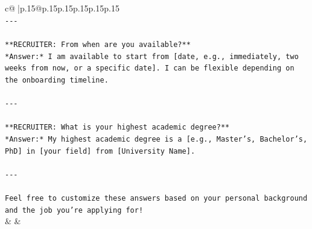 \documentclass{article}
\begin{document}
{\begin{supertabular}{c@{$\;$}|p{.15\linewidth}@{}p{.15\linewidth}p{.15\linewidth}p{.15\linewidth}p{.15\linewidth}p{.15\linewidth}}
{{{\\ 
\texttt{{-}{-}{-}} \\
\\ 
\texttt{**RECRUITER: From when are you available?**  } \\
\texttt{*Answer:* I am available to start from {[}date, e.g., immediately, two weeks from now, or a specific date{]}. I can be flexible depending on the onboarding timeline.  } \\
\\ 
\texttt{{-}{-}{-}} \\
\\ 
\texttt{**RECRUITER: What is your highest academic degree?**  } \\
\texttt{*Answer:* My highest academic degree is a {[}e.g., Master’s, Bachelor’s, PhD{]} in {[}your field{]} from {[}University Name{]}.  } \\
\\ 
\texttt{{-}{-}{-}} \\
\\ 
\texttt{Feel free to customize these answers based on your personal background and the job you're applying for!} \\
            }
        }
    }
    & & \\ \\


\end{supertabular}}
\end{document}
